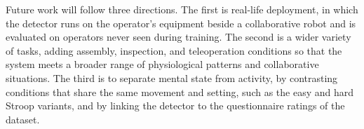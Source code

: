 \documentclass[a4paper,twoside]{article}
\begin{document}
Future work will follow three directions. The first is real-life deployment, in which the detector runs on the operator's equipment beside a collaborative robot and is evaluated on operators never seen during training. The second is a wider variety of tasks, adding assembly, inspection, and teleoperation conditions so that the system meets a broader range of physiological patterns and collaborative situations. The third is to separate mental state from activity, by contrasting conditions that share the same movement and setting, such as the easy and hard Stroop variants, and by linking the detector to the questionnaire ratings of the dataset.

{\small
    }
\end{document}
